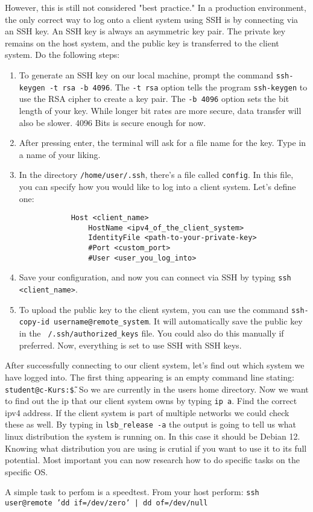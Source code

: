 \documentclass{dcbl/challenge}
\begin{document}
\begin{aufgabe}
    \item However, this is still not considered "best practice." In a production environment, the only correct way to log onto a client system using SSH is by connecting via an SSH key. An SSH key is always an asymmetric key pair. The private key remains on the host system, and the public key is transferred to the client system. Do the following steps:
    \begin{enumerate}
        \item To generate an SSH key on our local machine, prompt the command \texttt{ssh-keygen -t rsa -b 4096}. The \texttt{-t rsa} option tells the program \texttt{ssh-keygen} to use the RSA cipher to create a key pair. The \texttt{-b 4096} option sets the bit length of your key. While longer bit rates are more secure, data transfer will also be slower. 4096 Bits is secure enough for now.
        \item After pressing enter, the terminal will ask for a file name for the key. Type in a name of your liking.
        \item In the directory \texttt{/home/user/.ssh}, there's a file called \texttt{config}. In this file, you can specify how you would like to log into a client system. Let's define one:
        \begin{lstlisting}
            Host <client_name>
                HostName <ipv4_of_the_client_system>
                IdentityFile <path-to-your-private-key>
                #Port <custom_port>
                #User <user_you_log_into>
        \end{lstlisting}
        \item Save your configuration, and now you can connect via SSH by typing \texttt{ssh <client_name>}.
        \item To upload the public key to the client system, you can use the command \texttt{ssh-copy-id username@remote_system}. It will automatically save the public key in the \texttt{~/.ssh/authorized\_keys} file. You could also do this manually if preferred. Now, everything is set to use SSH with SSH keys.
    \end{enumerate}

    \item After successfully connecting to our client system, let's find out which system we have logged into. The first thing appearing is an empty command line stating: \texttt{student@c-Kurs:\~\$}. So we are currently in the users home directory.
        Now we want to find out the ip that our client system owns by typing \texttt{ip a}. Find the correct ipv4 address. If the client system is part of multiple networks we could check these as well. 
        By typing in \texttt{lsb_release -a} the output is going to tell us what linux distribution the system is running on. In this case it should be Debian 12.
        Knowing what distribution you are using is crutial if you want to use it to its full potential. Most important you can now research how to do specific tasks on the specific OS.
    \item A simple task to perfom is a speedtest. From your host perform: \texttt{ssh user@remote 'dd if=/dev/zero' | dd of=/dev/null}
\end{aufgabe}
\end{document}
